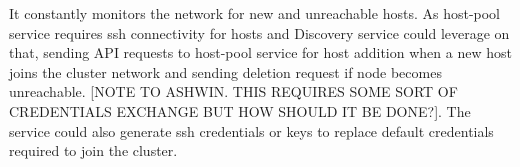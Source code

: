 It constantly monitors the network for new and unreachable hosts. As host-pool service requires ssh connectivity for hosts and Discovery service could leverage on that, sending API requests to host-pool service for host addition when a new host joins the cluster network and sending deletion request if node becomes unreachable. [NOTE TO ASHWIN. THIS REQUIRES SOME SORT OF CREDENTIALS EXCHANGE BUT HOW SHOULD IT BE DONE?]. The service could also generate ssh credentials or keys to replace default credentials required to join the cluster.